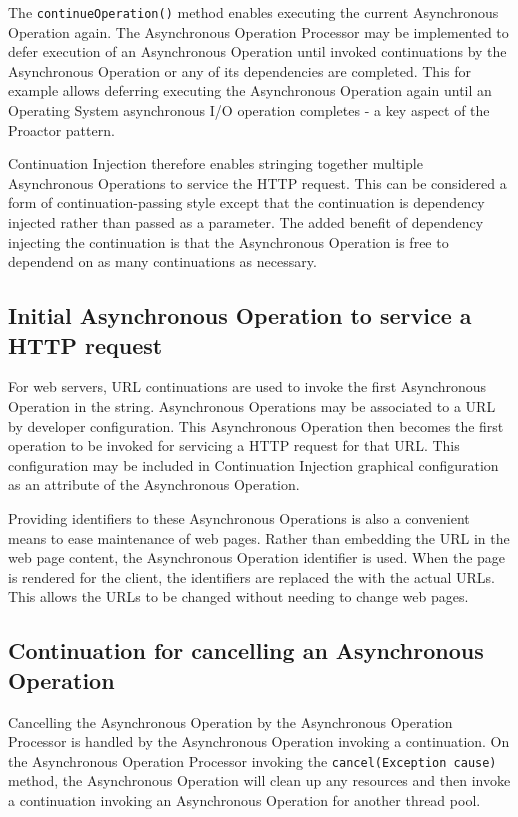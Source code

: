 \documentclass{article}
\begin{document}
The \texttt{continueOperation()} method enables executing the current
Asynchronous Operation again.  The Asynchronous Operation Processor may be
implemented to defer execution of an Asynchronous Operation until invoked
continuations by the Asynchronous Operation or any of its dependencies are
completed.  This for example allows deferring executing the Asynchronous
Operation again until an Operating System asynchronous I/O operation completes -
a key aspect of the Proactor pattern.

Continuation Injection therefore enables stringing together multiple
Asynchronous Operations to service the HTTP request.  This can be considered a
form of continuation-passing style \cite{continuations} except that the
continuation is dependency injected rather than passed as a parameter.  The
added benefit of dependency injecting the continuation is that the Asynchronous
Operation is free to dependend on as many continuations as necessary.


\subsection{Initial Asynchronous Operation to service a HTTP request}

For web servers, URL continuations \cite{url-continuation} are used to invoke
the first Asynchronous Operation in the string.  Asynchronous Operations may be
associated to a URL by developer configuration.  This Asynchronous Operation
then becomes the first operation to be invoked for servicing a HTTP request for
that URL.  This configuration may be included in Continuation Injection graphical
configuration as an attribute of the Asynchronous Operation.

Providing identifiers to these Asynchronous Operations is also a convenient
means to ease maintenance of web pages.  Rather than embedding the URL in the
web page content, the Asynchronous Operation identifier is used.  When the page
is rendered for the client, the identifiers are replaced the with the actual
URLs.  This allows the URLs to be changed without needing to change web pages.


\subsection{Continuation for cancelling an Asynchronous Operation}

Cancelling the Asynchronous Operation by the Asynchronous Operation Processor is
handled by the Asynchronous Operation invoking a continuation.  On the
Asynchronous Operation Processor invoking the \texttt{cancel(Exception cause)}
method, the Asynchronous Operation will clean up any resources and then invoke a
continuation invoking an Asynchronous Operation for another thread pool.
\end{document}
